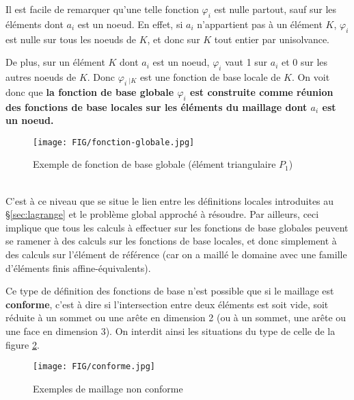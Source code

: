%
%
Il est facile de remarquer qu'une telle fonction $\varphi_i$ est nulle
partout, sauf sur les éléments dont $a_i$ est un noeud. En effet, si $a_i$
n'appartient pas à un élément $K$, $\varphi_i$ est nulle sur tous les
noeuds de $K$, et donc sur $K$ tout entier par unisolvance.

De plus, sur un élément $K$ dont $a_i$ est un noeud, $\varphi_i$ vaut 1
sur $a_i$ et 0 sur les autres noeuds de $K$. Donc $\varphi_i\, _{|K}$ est une
fonction de base locale de $K$. On voit donc que {\bf la fonction de base
globale $\varphi_i$ est construite comme réunion des fonctions de base
locales sur les éléments du maillage dont $a_i$ est un noeud.}
%
\begin{figure}[h]
\begin{center}
\texttt{[image: FIG/fonction-globale.jpg]}
\caption{Exemple de fonction de base globale (élément triangulaire $P_1$)}
\label{fig:fnglob}
\end{center}
\end{figure}\\
%
C'est à ce niveau que se situe le lien entre les définitions locales
introduites au \S \ref{sec:lagrange} et le problème global approché à
résoudre. Par ailleurs, ceci implique que tous les calculs à effectuer sur
les fonctions de base globales peuvent se ramener à des calculs sur les
fonctions de base locales, et donc simplement à des calculs sur
l'élément de référence (car on a maillé le domaine avec une famille
d'éléments finis affine-équivalents).
%
%
\newpage
%
\noindent
\begin{remark}
  Ce type de définition des fonctions de base n'est possible que si le
  maillage est {\bf conforme}, c'est à dire si l'intersection entre deux
  éléments est soit vide, soit réduite à un sommet ou une arête en
  dimension 2 (ou à un sommet, une arête ou une face en dimension 3). On
  interdit ainsi les situations du type de celle de la figure
  \ref{fig:nonconf}.\label{rem:11}
\end{remark}

%
%
\begin{figure}[h]
\begin{center}
\texttt{[image: FIG/conforme.jpg]}
\caption{Exemples de maillage non conforme}
\label{fig:nonconf}
\end{center}
\end{figure}
%
%
